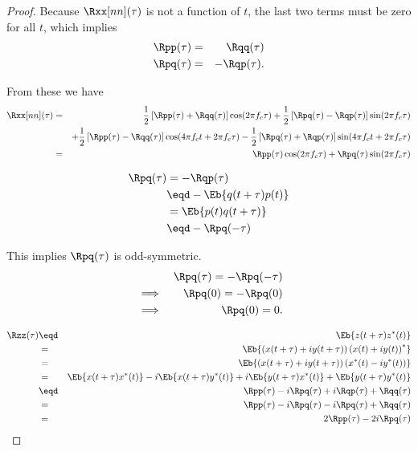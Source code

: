 \begin{proof}
Because $\Rxx[nn](\tau)$ is not a function of $t$,
the last two terms must be zero for all $t$,
which implies
\begin{eqnarray*}
   \Rpp(\tau) &=& \Rqq(\tau)   \\
   \Rpq(\tau) &=& -\Rqp(\tau).
\end{eqnarray*}

From these we have
\begin{eqnarray*}
\Rxx[nn](\tau)
     &=& \frac{1}{2}\left[ \Rpp(\tau) + \Rqq(\tau)\right] \cos(2\pi f_c\tau)
        +\frac{1}{2}\left[ \Rpq(\tau) - \Rqp(\tau)\right] \sin(2\pi f_c\tau)
   \\&& +\frac{1}{2}\left[ \Rpp(\tau) - \Rqq(\tau)\right] \cos(4\pi f_ct + 2\pi f_c\tau)
        -\frac{1}{2}\left[ \Rpq(\tau) + \Rqp(\tau)\right] \sin(4\pi f_ct + 2\pi f_c\tau)
%
   \\&=& \Rpp(\tau)\cos(2\pi f_c\tau) +\Rpq(\tau)\sin(2\pi f_c\tau)
\end{eqnarray*}

\begin{align*}
   \Rpq(\tau)
     &=      -\Rqp(\tau)
   \\&\eqd -\Eb{q(t+\tau) p(t)}
   \\&=       \Eb{p(t) q(t+\tau)}
   \\&\eqd -\Rpq(-\tau)
\end{align*}

This implies
$\Rpq(\tau)$ is odd-symmetric. \\
\begin{eqnarray*}
     &&          \Rpq(\tau)= -\Rpq(-\tau)
   \\&\implies&  \Rpq(0)= -\Rpq(0)
   \\&\implies&  \Rpq(0)=0.
\end{eqnarray*}


\begin{eqnarray*}
   \Rzz(\tau)
     &\eqd& \Eb{z(t+\tau)z^\ast(t)}
   \\&=&      \Eb{\left( x(t+\tau) + iy(t+\tau)\right)\left( x(t) + iy(t)\right)^\ast}
   \\&=&      \Eb{\left( x(t+\tau) + iy(t+\tau)\right)\left( x^\ast(t) - iy^\ast(t)\right)}
%
   \\&=&      \Eb{ x(t+\tau)x^\ast(t) }
       -     i\Eb{ x(t+\tau)y^\ast(t) }
       +     i\Eb{ y(t+\tau)x^\ast(t) }
       +      \Eb{ y(t+\tau)y^\ast(t) }
%
   \\&\eqd& \Rpp(\tau) - i\Rpq(\tau) + i\Rqp(\tau) + \Rqq(\tau)
   \\&=&      \Rpp(\tau) - i\Rpq(\tau) - i\Rpq(\tau) + \Rqq(\tau)
   \\&=&      2\Rpp(\tau) - 2i\Rpq(\tau)
\end{eqnarray*}
\end{proof}




